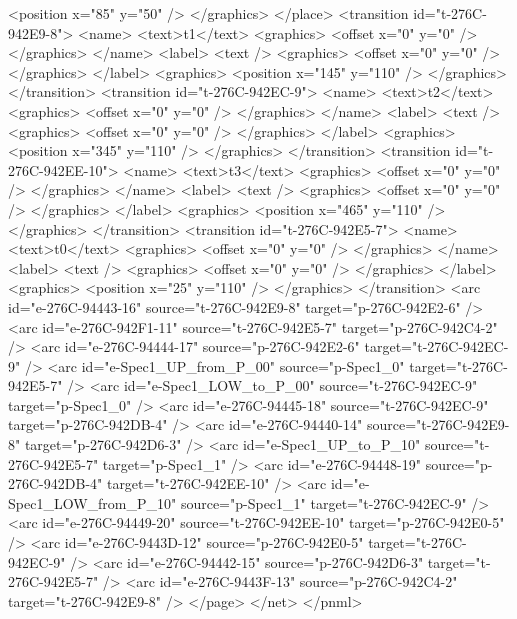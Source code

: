      <position x="85" y="50" />
    </graphics>
   </place>
   <transition id="t-276C-942E9-8">
    <name>
     <text>t1</text>
     <graphics>
      <offset x="0" y="0" />
     </graphics>
    </name>
    <label>
     <text />
     <graphics>
      <offset x="0" y="0" />
     </graphics>
    </label>
    <graphics>
     <position x="145" y="110" />
    </graphics>
   </transition>
   <transition id="t-276C-942EC-9">
    <name>
     <text>t2</text>
     <graphics>
      <offset x="0" y="0" />
     </graphics>
    </name>
    <label>
     <text />
     <graphics>
      <offset x="0" y="0" />
     </graphics>
    </label>
    <graphics>
     <position x="345" y="110" />
    </graphics>
   </transition>
   <transition id="t-276C-942EE-10">
    <name>
     <text>t3</text>
     <graphics>
      <offset x="0" y="0" />
     </graphics>
    </name>
    <label>
     <text />
     <graphics>
      <offset x="0" y="0" />
     </graphics>
    </label>
    <graphics>
     <position x="465" y="110" />
    </graphics>
   </transition>
   <transition id="t-276C-942E5-7">
    <name>
     <text>t0</text>
     <graphics>
      <offset x="0" y="0" />
     </graphics>
    </name>
    <label>
     <text />
     <graphics>
      <offset x="0" y="0" />
     </graphics>
    </label>
    <graphics>
     <position x="25" y="110" />
    </graphics>
   </transition>
   <arc id="e-276C-94443-16" source="t-276C-942E9-8" target="p-276C-942E2-6" />
   <arc id="e-276C-942F1-11" source="t-276C-942E5-7" target="p-276C-942C4-2" />
   <arc id="e-276C-94444-17" source="p-276C-942E2-6" target="t-276C-942EC-9" />
   <arc id="e-Spec1\_UP\_from\_P\_00" source="p-Spec1\_0" target="t-276C-942E5-7" />
   <arc id="e-Spec1\_LOW\_to\_P\_00" source="t-276C-942EC-9" target="p-Spec1\_0" />
   <arc id="e-276C-94445-18" source="t-276C-942EC-9" target="p-276C-942DB-4" />
   <arc id="e-276C-94440-14" source="t-276C-942E9-8" target="p-276C-942D6-3" />
   <arc id="e-Spec1\_UP\_to\_P\_10" source="t-276C-942E5-7" target="p-Spec1\_1" />
   <arc id="e-276C-94448-19" source="p-276C-942DB-4" target="t-276C-942EE-10" />
   <arc id="e-Spec1\_LOW\_from\_P\_10" source="p-Spec1\_1" target="t-276C-942EC-9" />
   <arc id="e-276C-94449-20" source="t-276C-942EE-10" target="p-276C-942E0-5" />
   <arc id="e-276C-9443D-12" source="p-276C-942E0-5" target="t-276C-942EC-9" />
   <arc id="e-276C-94442-15" source="p-276C-942D6-3" target="t-276C-942E5-7" />
   <arc id="e-276C-9443F-13" source="p-276C-942C4-2" target="t-276C-942E9-8" />
  </page>
 </net>
</pnml>
